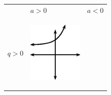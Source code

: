 \setlength\mytablespace{6\tabcolsep}
\addtolength\mytablespace{4\arrayrulewidth}
\setlength\mytablewidth{\linewidth}
\setlength\mytableroom{\mytablewidth}
\addtolength\mytableroom{-\mytablespace}
\setlength\myfixedwidth{0pt}
\setlength\mystarwidth{\mytableroom}
\addtolength\mystarwidth{-\myfixedwidth}
\divide{}
\begin{center}
\label{m39348*uid186}
\noindent
{}
\tablelasttail{}
\begin{xtabular*}{\mytablewidth}[t]{|p{10\mystarwidth}|p{10\mystarwidth}|p{10\mystarwidth}|}\hline
&
    $a>0$
    &
    $a<0$
\tabularnewline{}
    $q>0$
    &
\setcounter{subfigure}{0}
\label{m39348*id250546}
\begin{center}
\label{m39348*id250546!!!underscore!!!media}\label{m39348*id250546!!!underscore!!!printimage}\includegraphics[width=100px]{col11306.imgs/m39348_MG10C11_028.png} %

\end{center}
\end{xtabular*}
\end{center}
